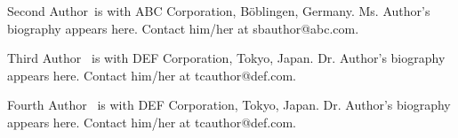 \documentclass{IEEEmce}
\begin{document}
\begin{IEEEbiography}{Second Author}{\,} is with ABC Corporation, B\"oblingen, Germany. Ms. Author's biography appears here. Contact him/her at sbauthor@abc.com.
\end{IEEEbiography}

\begin{IEEEbiography}{Third Author} {\,} is with DEF Corporation, Tokyo, Japan. Dr. Author's biography appears here. Contact him/her at tcauthor@def.com.
\end{IEEEbiography}

\begin{IEEEbiography}{Fourth Author} {\,} is with DEF Corporation, Tokyo, Japan. Dr. Author's biography appears here. Contact him/her at tcauthor@def.com.
\end{IEEEbiography}
\end{document}
